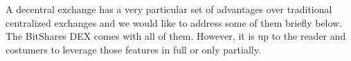 A decentral exchange has a very particular set of advantages over traditional
centralized exchanges and we would like to address some of them briefly below.
The BitShares DEX comes with all of them. However, it is up to the reader and
costumers to leverage those features in full or only partially.
